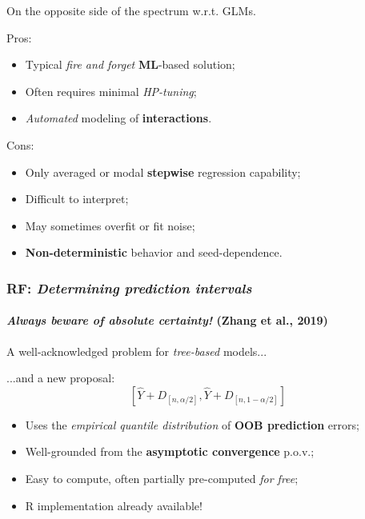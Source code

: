 \documentclass{beamer}
\begin{document}
{\begin{frame}
	On the opposite side of the spectrum w.r.t. GLMs.

	\hfill

	Pros:
	\begin{itemize}
		\item{Typical \textit{fire and forget} \textbf{ML}-based solution;}
		\item{Often requires minimal \textit{HP-tuning};}
		\item{\textit{Automated} modeling of \textbf{interactions}.}
	\end{itemize}

	\hfill

	Cons:
	\begin{itemize}
		\item{Only averaged or modal \textbf{stepwise} regression capability;}
		\item{Difficult to interpret;}
		\item{May sometimes overfit or fit noise;}
		\item{\textbf{Non-deterministic} behavior and seed-dependence.}
	\end{itemize}

\end{frame}


\begin{frame}
	\frametitle{RF: \textit{Determining prediction intervals}}
	\framesubtitle{\textit{Always beware of absolute certainty!} (Zhang et al., 2019)}

	A well-acknowledged problem for \textit{tree-based} models...

	\hfill

	...and a new proposal:
	$$
	\left[ { \hat{Y} + D_{\left[ { n, \alpha/2 } \right]}, \hat{Y} + D_{\left[ { n, 1-\alpha/2 } \right]} } \right]
	$$

	\hfill

	\begin{itemize}
		\item{Uses the \textit{empirical quantile distribution} of \textbf{OOB prediction} errors;}
		\item{Well-grounded from the \textbf{asymptotic convergence} p.o.v.;}
		\item{Easy to compute, often partially pre-computed \textit{for free};}
		\item{\textsf{R} implementation already available!}
	\end{itemize}
\end{frame}


}
\end{document}
